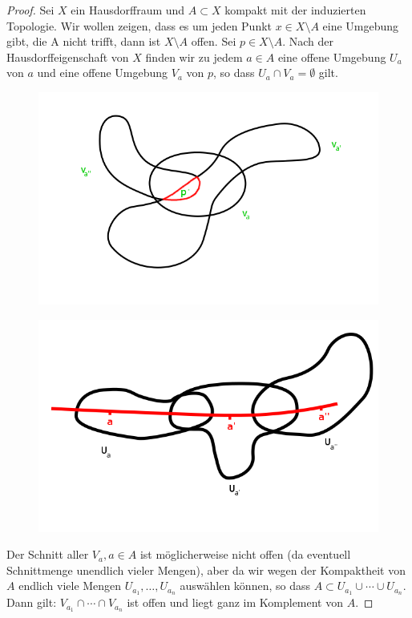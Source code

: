 \documentclass[a4paper,10pt]{scrartcl}
\begin{document}
\begin{proof}
 Sei $X$ ein Hausdorffraum und $A\subset X$ kompakt mit der induzierten Topologie. Wir wollen zeigen, dass es um jeden Punkt $x\in X\setminus A$ eine Umgebung gibt, die A nicht trifft, dann ist $X\setminus A$ offen. Sei $p\in X\setminus A$. Nach der Hausdorffeigenschaft von $X$ finden wir zu jedem $a\in A$ eine offene Umgebung $U_a$ von $a$ und eine offene Umgebung $V_a$ von $p$, so dass $U_a\cap V_a=\emptyset$ gilt. \\
\begin{figure}[h]
\centering
\includegraphics[scale=0.5]{fig28.png}
\caption{}
\end{figure}


\begin{figure}[h]
\centering
\includegraphics[scale=0.5]{fig29.png}
\caption{}
\end{figure}

Der Schnitt aller $V_a, a\in A$ ist möglicherweise nicht offen (da eventuell Schnittmenge unendlich vieler Mengen), aber da wir wegen der Kompaktheit von $A$ endlich viele Mengen $U_{a_1},\dotsc  , U_{a_n}$ auswählen können, so dass $A\subset U_{a_1}\cup\dotsb \cup U_{a_n}$. Dann gilt: $V_{a_1}\cap\dotsb \cap V_{a_n}$ ist offen und liegt ganz im Komplement von $A$.
\end{proof}
\end{document}
